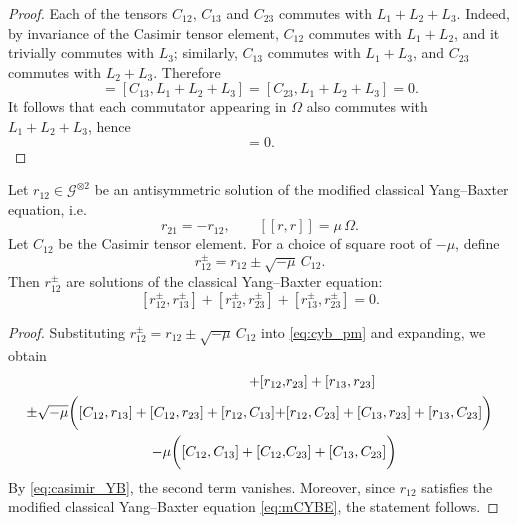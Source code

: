 \begin{proof}
    Each of the tensors $C_{12}$, $C_{13}$ and $C_{23}$ commutes with $L_1+L_2+L_3$. 
    Indeed, by invariance of the Casimir tensor element, $C_{12}$ commutes with $L_1+L_2$, and it trivially commutes with $L_3$; similarly, $C_{13}$ commutes with $L_1+L_3$, and $C_{23}$ commutes with $L_2+L_3$. Therefore
    \begin{equation}
        [C_{12},L_1+L_2+L_3]=[C_{13},L_1+L_2+L_3]=[C_{23},L_1+L_2+L_3]=0.
    \end{equation}
    It follows that each commutator appearing in $\Omega$ also commutes with $L_1+L_2+L_3$, hence
    \begin{equation}
        [\Omega, L_1+L_2+L_3] = 0.
    \end{equation}
\end{proof}

\begin{lemma}
    Let $r_{12} \in \mathcal{G}^{\otimes2}$ be an antisymmetric solution of the modified classical Yang--Baxter equation, i.e.
    \begin{equation}
        r_{21} = -r_{12}, \qquad [[r,r]] = \mu \, \Omega .
    \end{equation}
    Let $C_{12}$ be the Casimir tensor element. For a choice of square root of $-\mu$, define
    \begin{equation}
        r_{12}^{\pm} = r_{12} \pm \sqrt{-\mu}\, C_{12}.
    \end{equation}
    Then $r_{12}^{\pm}$ are solutions of the classical Yang--Baxter equation:
    \begin{equation}\label{eq:cyb_pm}
        [r_{12}^{\pm},r_{13}^{\pm}] + [r_{12}^{\pm},r_{23}^{\pm}] + [r_{13}^{\pm},r_{23}^{\pm}] = 0.
    \end{equation}
\end{lemma}
\begin{proof}
    Substituting $r_{12}^{\pm}=r_{12}\pm \sqrt{-\mu} \, C_{12}$ into \eqref{eq:cyb_pm} and expanding, we obtain
    \begin{align}
        [r_{12},r_{13}] + [r_{12},&r_{23}] + [r_{13},r_{23}] \notag \\
        \pm \sqrt{-\mu} \bigg( 
        [C_{12},r_{13}] + [C_{12},r_{23}]
        + [r_{12},C_{13}] +& [r_{12},C_{23}]
        + [C_{13},r_{23}] + [r_{13},C_{23}]
        \bigg) \notag \\
        -\mu \bigg(
        [C_{12},C_{13}] + [C_{12},&C_{23}] + [C_{13},C_{23}]
        \bigg)
    \end{align}
    By \eqref{eq:casimir_YB}, the second term vanishes. Moreover, since $r_{12}$ satisfies the modified classical Yang--Baxter equation \eqref{eq:mCYBE}, the statement follows.
\end{proof}
